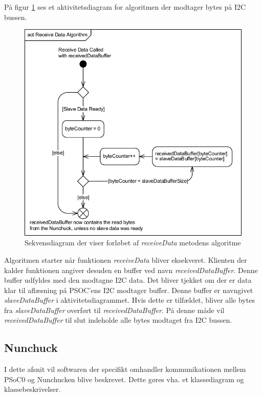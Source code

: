 På figur \ref{figure:ReceiveDataAlgorithm} ses et aktivitetsdiagram for algoritmen der modtager bytes på I2C bussen.

\begin{figure}[H]
	\centering
	\includegraphics[]{DesignOgImplementering/images/ReceiveDataAlgorithm}
	\caption{Sekvensdiagram der viser forløbet af \textit{receiveData} metodens algoritme}
	\label{figure:ReceiveDataAlgorithm}
\end{figure}

\noindent Algoritmen starter når funktionen \textit{receiveData} bliver eksekveret. Klienten der kalder funktionen angiver desuden en buffer ved navn \textit{receivedDataBuffer}. Denne buffer udfyldes med den modtagne I2C data. Det bliver tjekket om der er data klar til aflæsning på PSOC'ens I2C modtager buffer. Denne buffer er navngivet \textit{slaveDataBuffer} i aktivitetsdiagrammet. Hvis dette er tilfældet, bliver alle bytes fra \textit{slaveDataBuffer} overført til \textit{receivedDataBuffer}. På denne måde vil \textit{receivedDataBuffer} til slut indeholde alle bytes modtaget fra I2C bussen.

\subsection{Nunchuck}
I dette afsnit vil softwaren der specifikt omhandler kommunikationen mellem PSoC0 og Nunchucken blive beskrevet. Dette gøres vha. et klassediagram og klassebeskrivelser.

